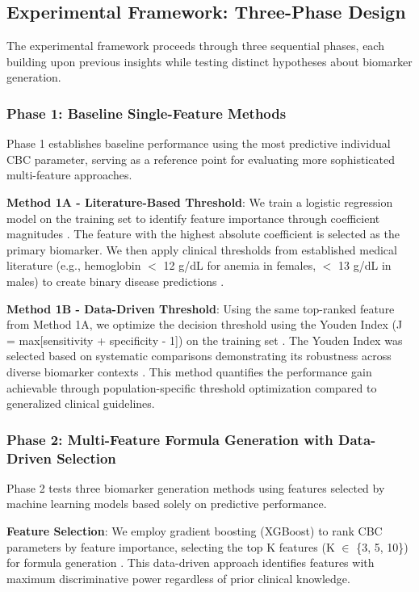 \documentclass[12pt,a4paper]{article}
\begin{document}
\subsection{Experimental Framework: Three-Phase Design}

The experimental framework proceeds through three sequential phases, each building upon previous insights while testing distinct hypotheses about biomarker generation.

\subsubsection{Phase 1: Baseline Single-Feature Methods}

Phase 1 establishes baseline performance using the most predictive individual CBC parameter, serving as a reference point for evaluating more sophisticated multi-feature approaches.

\textbf{Method 1A - Literature-Based Threshold}: We train a logistic regression model on the training set to identify feature importance through coefficient magnitudes \cite{ref21}. The feature with the highest absolute coefficient is selected as the primary biomarker. We then apply clinical thresholds from established medical literature (e.g., hemoglobin $<$ 12 g/dL for anemia in females, $<$ 13 g/dL in males) to create binary disease predictions \cite{ref9,ref10}.

\textbf{Method 1B - Data-Driven Threshold}: Using the same top-ranked feature from Method 1A, we optimize the decision threshold using the Youden Index (J = max[sensitivity + specificity - 1]) on the training set \cite{ref19,ref27}. The Youden Index was selected based on systematic comparisons demonstrating its robustness across diverse biomarker contexts \cite{ref19}. This method quantifies the performance gain achievable through population-specific threshold optimization compared to generalized clinical guidelines.

\subsubsection{Phase 2: Multi-Feature Formula Generation with Data-Driven Selection}

Phase 2 tests three biomarker generation methods using features selected by machine learning models based solely on predictive performance.

\textbf{Feature Selection}: We employ gradient boosting (XGBoost) to rank CBC parameters by feature importance, selecting the top K features (K $\in$ \{3, 5, 10\}) for formula generation \cite{ref22,ref24}. This data-driven approach identifies features with maximum discriminative power regardless of prior clinical knowledge.
\end{document}
